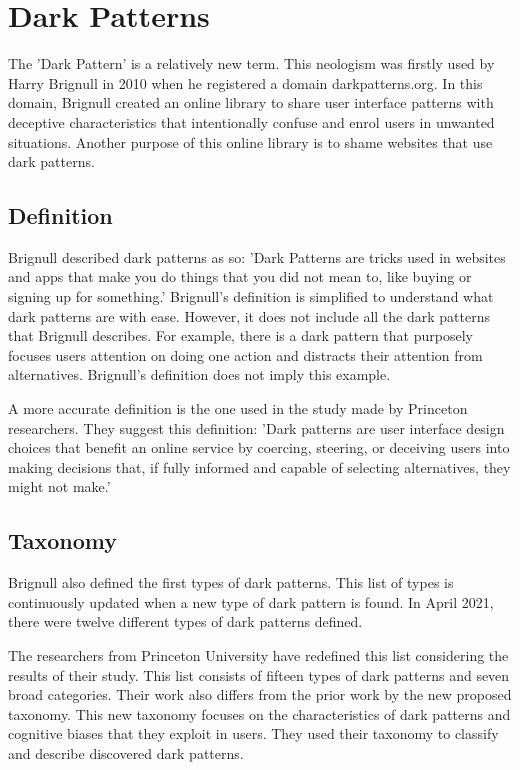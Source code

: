\chapter{Dark Patterns}
The 'Dark Pattern' is a relatively new term. This neologism was firstly used by Harry Brignull in 2010\cite{dark-patterns-arstechnica} when he registered a domain darkpatterns.org. In this domain, Brignull created an online library to share user interface patterns with deceptive characteristics that intentionally confuse and enrol users in unwanted situations. Another purpose of this online library is to shame websites that use dark patterns.

\section{Definition}
Brignull described dark patterns as so: 'Dark Patterns are tricks used in websites and apps that make you do things that you did not mean to, like buying or signing up for something.'\cite{dark-patterns-brignull} Brignull's definition is simplified to understand what dark patterns are with ease. However, it does not include all the dark patterns that Brignull describes. For example, there is a dark pattern that purposely focuses users attention on doing one action and distracts their attention from alternatives. Brignull's definition does not imply this example.

A more accurate definition is the one used in the study made by Princeton researchers. They suggest this definition: 'Dark patterns are user interface design choices that benefit an online service by coercing, steering, or deceiving users into making decisions that, if fully informed and capable of selecting alternatives, they might not make.' \cite{dark-patterns-at-scale}
\section{Taxonomy}

Brignull also defined the first types of dark patterns. This list of types is continuously updated when a new type of dark pattern is found. In April 2021, there were twelve different types of dark patterns defined\cite{dark-patterns-brignull-types}.

The researchers from Princeton University have redefined this list considering the results of their study. This list consists of fifteen types of dark patterns and seven broad categories. Their work also differs from the prior work\cite{dark-patterns-brignull,taxonomies-tales,taxonomies-conti} by the new proposed taxonomy. This new taxonomy focuses on the characteristics of dark patterns and cognitive biases that they exploit in users. They used their taxonomy to classify and describe discovered dark patterns.

